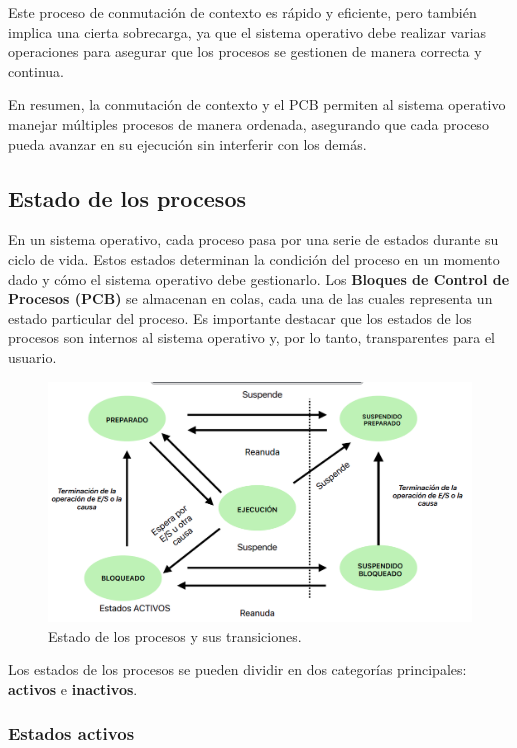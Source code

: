 Este proceso de conmutación de contexto es rápido y eficiente, pero también implica una cierta sobrecarga, ya que el sistema operativo debe realizar varias operaciones para asegurar que los procesos se gestionen de manera correcta y continua.

En resumen, la conmutación de contexto y el PCB permiten al sistema operativo manejar múltiples procesos de manera ordenada, asegurando que cada proceso pueda avanzar en su ejecución sin interferir con los demás.




\subsection{Estado de los procesos}

En un sistema operativo, cada proceso pasa por una serie de estados durante su ciclo de vida. Estos estados determinan la condición del proceso en un momento dado y cómo el sistema operativo debe gestionarlo. Los \textbf{Bloques de Control de Procesos (PCB)} se almacenan en colas, cada una de las cuales representa un estado particular del proceso. Es importante destacar que los estados de los procesos son internos al sistema operativo y, por lo tanto, transparentes para el usuario.

\begin{figure}[H]
	\centering
	\includegraphics[width=0.8\linewidth]{Imagenes/procesosesquema.png}
	\caption{Estado de los procesos y sus transiciones. }
	\label{fig:enter-label}
\end{figure}

Los estados de los procesos se pueden dividir en dos categorías principales: \textbf{activos} e \textbf{inactivos}.

\newpage
\subsubsection{Estados activos}

